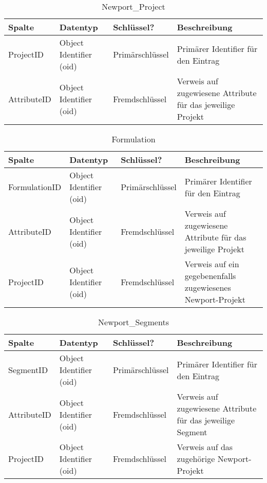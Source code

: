 \begin{table}[hbt]
    \centering
    \caption{Newport\_Project}
    \begin{tabularx}{\textwidth}{l l l X}
        \toprule
        \textbf{Spalte} & \textbf{Datentyp} & \textbf{Schlüssel?} & \textbf{Beschreibung} \\
        \midrule
        ProjectID & Object Identifier (oid) & Primärschlüssel & Primärer Identifier für den Eintrag \\
        AttributeID & Object Identifier (oid) & Fremdschlüssel & Verweis auf zugewiesene Attribute für das jeweilige Projekt \\
        \bottomrule
    \end{tabularx}
    \label{tab:newport_project}
\end{table}

\begin{table}[hbt]
    \centering
    \caption{Formulation}
    \begin{tabularx}{\textwidth}{l l l X}
        \toprule
        \textbf{Spalte} & \textbf{Datentyp} & \textbf{Schlüssel?} & \textbf{Beschreibung} \\
        \midrule
        FormulationID & Object Identifier (oid) & Primärschlüssel & Primärer Identifier für den Eintrag\\
        AttributeID & Object Identifier (oid) & Fremdschlüssel & Verweis auf zugewiesene Attribute für das jeweilige Projekt\\
        ProjectID & Object Identifier (oid) & Fremdschlüssel & Verweis auf ein gegebenenfalls zugewiesenes Newport-Projekt\\
        \bottomrule
    \end{tabularx}
    \label{tab:formulation}
\end{table}

\begin{table}[hbt]
    \centering
    \caption{Newport\_Segments}
    \begin{tabularx}{\textwidth}{l l l X}
        \toprule
        \textbf{Spalte} & \textbf{Datentyp} & \textbf{Schlüssel?} & \textbf{Beschreibung} \\
        \midrule
        SegmentID & Object Identifier (oid) & Primärschlüssel & Primärer Identifier für den Eintrag\\
        AttributeID & Object Identifier (oid) & Fremdschlüssel & Verweis auf zugewiesene Attribute für das jeweilige Segment\\
        ProjectID & Object Identifier (oid) & Fremdschlüssel & Verweis auf das zugehörige Newport-Projekt\\
        \bottomrule
    \end{tabularx}
    \label{tab:formulation}
\end{table}

